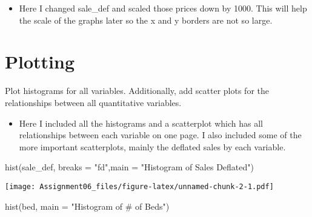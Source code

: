 \documentclass[
]{article}
\newenvironment{Shaded}{\begin{snugshade}}{\end{snugshade}}
\newcommand{\AttributeTok}[1]{\textcolor[rgb]{0.77,0.63,0.00}{#1}}
\newcommand{\DecValTok}[1]{\textcolor[rgb]{0.00,0.00,0.81}{#1}}
\newcommand{\FunctionTok}[1]{\textcolor[rgb]{0.00,0.00,0.00}{#1}}
\newcommand{\NormalTok}[1]{#1}
\newcommand{\OtherTok}[1]{\textcolor[rgb]{0.56,0.35,0.01}{#1}}
\newcommand{\SpecialCharTok}[1]{\textcolor[rgb]{0.00,0.00,0.00}{#1}}
\newcommand{\StringTok}[1]{\textcolor[rgb]{0.31,0.60,0.02}{#1}}
\providecommand{\tightlist}{%
  \setlength{\itemsep}{0pt}\setlength{\parskip}{0pt}}
\begin{document}
\begin{Shaded}
\end{Shaded}

\begin{itemize}
\tightlist
\item
  Here I changed sale\_def and scaled those prices down by 1000. This
  will help the scale of the graphs later so the x and y borders are not
  so large.
\end{itemize}

\hypertarget{plotting}{%
\section{Plotting}\label{plotting}}

Plot histograms for all variables. Additionally, add scatter plots for
the relationships between all quantitative variables.

\begin{itemize}
\tightlist
\item
  Here I included all the histograms and a scatterplot which has all
  relationships between each variable on one page. I also included some
  of the more important scatterplots, mainly the deflated sales by each
  variable.
\end{itemize}

\begin{Shaded}
\begin{Highlighting}[]
\FunctionTok{hist}\NormalTok{(sale\_def, }\AttributeTok{breaks =} \StringTok{"fd"}\NormalTok{,}\AttributeTok{main =} \StringTok{"Histogram of Sales Deflated"}\NormalTok{)}
\end{Highlighting}
\end{Shaded}

\texttt{[image: Assignment06\_files/figure-latex/unnamed-chunk-2-1.pdf]}

\begin{Shaded}
\begin{Highlighting}[]
\FunctionTok{hist}\NormalTok{(bed, }\AttributeTok{main =} \StringTok{"Histogram of \# of Beds"}\NormalTok{)}
\end{Highlighting}
\end{Shaded}
\end{document}
